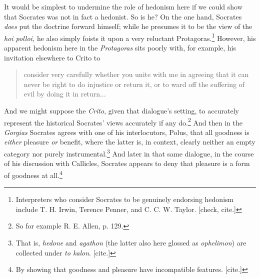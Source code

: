 \documentclass[11pt]{amsart}
\begin{document}
It would be simplest to undermine the role of hedonism here if we
could show that Socrates was not in fact a hedonist. So is he? On the
one hand, Socrates \emph{does} put the doctrine forward himself; while
he presumes it to be the view of the \emph{hoi polloi,} he also simply
foists it upon a very reluctant Protagoras.\footnote{Interpreters who
consider Socrates to be genuinely endorsing hedonism include T. H.
Irwin, Terence Penner, and C. C. W. Taylor. [check, cite.]} However,
his apparent hedonism here in the \emph{Protagoras} sits poorly with,
for example, his invitation elsewhere to Crito to
\begin{quote}consider very carefully whether you unite with me in
agreeing that it can never be right to do injustice or return it, or
to ward off the suffering of evil by doing it in return...\end{quote}
And we might suppose the \emph{Crito}, given that dialogue's setting,
to accurately represent the historical Socrates' views accurately if
any do.\footnote{So for example R. E. Allen, p. 129.} And then in the
\emph{Gorgias} Socrates agrees with one of his interlocutors, Polus,
that all goodness is \emph{either} pleasure \emph{or} benefit, where
the latter is, in context, clearly neither an empty category nor
purely instrumental.\footnote{That is, \emph{hedone} and
\emph{agathon} (the latter also here glossed as \emph{ophelimon}) are
collected under \emph{to kalon}. [cite.]} And later in that same
dialogue, in the course of his discussion with Callicles, Socrates
appears to deny that pleasure is a form of goodness at
all.\footnote{By showing that goodness and pleasure have incompatible
features. [cite.]}
\end{document}
